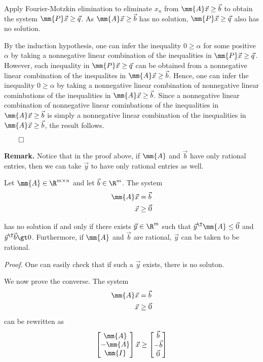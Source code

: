 Apply Fourier-Motzkin elimination to eliminate \(x_n\) from
\(\mm{A}\vec{x} \geq \vec{b}\) to obtain the system
\(\mm{P}\vec{x} \geq \vec{q}\). As \(\mm{A}\vec{x}\geq \vec{b}\) has no
solution, \(\mm{P}\vec{x} \geq \vec{q}\) also has no solution.

By the induction hypothesis, one can infer the inequality
\(0 \geq \alpha\) for some positive \(\alpha\) by taking a nonnegative
linear combination of the inequalities in
\(\mm{P}\vec{x} \geq \vec{q}\). However, each inequality in
\(\mm{P}\vec{x} \geq \vec{q}\) can be obtained from a nonnegative linear
combination of the inequalites in \(\mm{A}\vec{x} \geq \vec{b}\). Hence,
one can infer the inequality \(0 \geq \alpha\) by taking a nonnegative
linear combination of nonnegative linear cominbations of the
inequalities in \(\mm{A}\vec{x}\geq \vec{b}\). Since a nonnegative
linear combination of nonnegative linear cominbations of the
inequalities in \(\mm{A}\vec{x}\geq \vec{b}\) is simply a nonnegative
linear combination of the inequalities in \(\mm{A}\vec{x}\geq \vec{b}\),
the result follows.

\(\qed\)

\textbf{Remark.} Notice that in the proof above, if \(\mm{A}\) and
\(\vec{b}\) have only rational entries, then we can take \(\vec{y}\) to
have only rational entries as well.

\begin{corollary}{}{}
\protect\hypertarget{cor:farkas-std-eq}{}{\label{cor:farkas-std-eq}} Let
\(\mm{A} \in \R^{m\times n}\) and let \(\vec{b} \in \R^m\). The system
\begin{align*}
    \mm{A}\vec{x} & = \vec{b} \\
    \vec{x} & \geq \vec{0}
    \end{align*}

has no solution if and only if there exists \(\vec{y} \in \R^m\) such
that \(\vec{y}^\T \mm{A} \leq \vec{0}\) and \(\vec{y}^\T\vec{b} \gt 0\).
Furthermore, if \(\mm{A}\) and \(\vec{b}\) are rational, \(\vec{y}\) can
be taken to be rational.
\end{corollary}

\emph{Proof.} One can easily check that if such a \(\vec{y}\) exists,
there is no soluton.

We now prove the converse. The system
\begin{align*}
\mm{A}\vec{x} & = \vec{b} \\
\vec{x} & \geq \vec{0}
\end{align*}
can be rewritten as
\begin{align*}
\begin{bmatrix}
\mm{A} \\
-\mm{A} \\
\mm{I}
\end{bmatrix}\vec{x} \geq 
\begin{bmatrix}
\vec{b} \\
-\vec{b} \\
\vec{0}
\end{bmatrix}
\end{align*}


